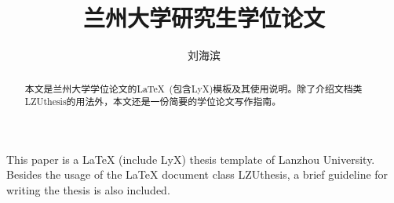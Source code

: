 \documentclass[twoside,longtitle]{LZUthesis}
\begin{document}
\classification{}

\confidential{}

\title{兰州大学研究生学位论文}




\author{刘海滨}






\submitdate{}


\degreedate{}


\maketitle

\makestatement

\frontmatter{}

\begin{abstract}
本文是兰州大学学位论文的\LaTeX{} (包含LyX)模板及其使用说明。除了介绍文档类LZUthesis的用法外，本文还是一份简要的学位论文写作指南。
\end{abstract}


\begin{englishabstract}
This paper is a \LaTeX{} (include LyX) thesis template of Lanzhou University. Besides the usage of the LaTeX document class LZUthesis, a brief guideline for writing the thesis is also included.
\end{englishabstract}

\end{document}
